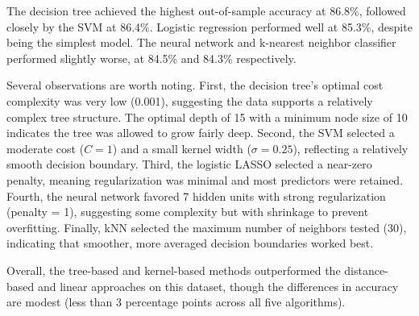 \documentclass{article}
\begin{document}
The decision tree achieved the highest out-of-sample accuracy at 86.8\%, followed closely by the SVM at 86.4\%. Logistic regression performed well at 85.3\%, despite being the simplest model. The neural network and k-nearest neighbor classifier performed slightly worse, at 84.5\% and 84.3\% respectively.

Several observations are worth noting. First, the decision tree's optimal cost complexity was very low (0.001), suggesting the data supports a relatively complex tree structure. The optimal depth of 15 with a minimum node size of 10 indicates the tree was allowed to grow fairly deep. Second, the SVM selected a moderate cost ($C=1$) and a small kernel width ($\sigma=0.25$), reflecting a relatively smooth decision boundary. Third, the logistic LASSO selected a near-zero penalty, meaning regularization was minimal and most predictors were retained. Fourth, the neural network favored 7 hidden units with strong regularization (penalty = 1), suggesting some complexity but with shrinkage to prevent overfitting. Finally, kNN selected the maximum number of neighbors tested (30), indicating that smoother, more averaged decision boundaries worked best.

Overall, the tree-based and kernel-based methods outperformed the distance-based and linear approaches on this dataset, though the differences in accuracy are modest (less than 3 percentage points across all five algorithms).
\end{document}
